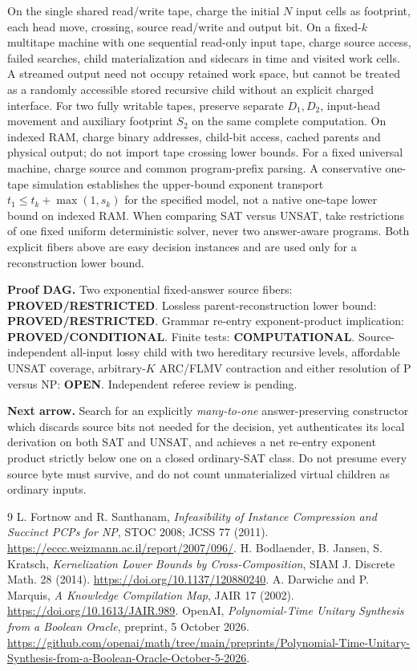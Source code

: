 \documentclass{article}
\begin{document}
On the single shared read/write tape, charge the initial $N$
input cells as footprint, each head move, crossing, source
read/write and output bit. On a fixed-$k$ multitape machine
with one sequential read-only input tape, charge source
access, failed searches, child materialization and sidecars in
time and visited work cells. A streamed output need not occupy
retained work space, but cannot be treated as a randomly accessible
stored recursive child without an explicit charged interface.
For two fully writable tapes, preserve separate $D_1,D_2$,
input-head movement and auxiliary footprint $S_2$ on the
same complete computation. On indexed RAM, charge binary
addresses, child-bit access, cached parents and physical output;
do not import tape crossing lower bounds. For a fixed universal
machine, charge source and common program-prefix parsing.
A conservative one-tape simulation establishes the
upper-bound exponent transport
$t_1\le t_k+\max(1,s_k)$ for the specified model, not a native
one-tape lower bound on indexed RAM.
When comparing SAT versus UNSAT, take restrictions of one
fixed uniform deterministic solver, never two answer-aware
programs. Both explicit fibers above are easy decision
instances and are used only for a reconstruction lower bound.

\noindent\textbf{Proof DAG.}
Two exponential fixed-answer source fibers:
\textbf{PROVED/RESTRICTED}.
Lossless parent-reconstruction lower bound:
\textbf{PROVED/RESTRICTED}.
Grammar re-entry exponent-product implication:
\textbf{PROVED/CONDITIONAL}.
Finite tests: \textbf{COMPUTATIONAL}.
Source-independent all-input lossy child with two hereditary
recursive levels, affordable UNSAT coverage, arbitrary-$K$
ARC/FLMV contraction and either resolution of P versus NP:
\textbf{OPEN}. Independent referee review is pending.

\noindent\textbf{Next arrow.}
Search for an explicitly \emph{many-to-one} answer-preserving
constructor which discards source bits not needed for
the decision, yet authenticates its local derivation on both
SAT and UNSAT, and achieves a net re-entry exponent product
strictly below one on a closed ordinary-SAT class.
Do not presume every source byte must survive, and do not
count unmaterialized virtual children as ordinary inputs.

\begin{thebibliography}{9}
 L. Fortnow and R. Santhanam,
\emph{Infeasibility of Instance Compression and Succinct PCPs for NP},
STOC 2008; JCSS 77 (2011).
\url{https://eccc.weizmann.ac.il/report/2007/096/}.
 H. Bodlaender, B. Jansen, S. Kratsch,
\emph{Kernelization Lower Bounds by Cross-Composition},
SIAM J. Discrete Math. 28 (2014).
\url{https://doi.org/10.1137/120880240}.
 A. Darwiche and P. Marquis,
\emph{A Knowledge Compilation Map}, JAIR 17 (2002).
\url{https://doi.org/10.1613/JAIR.989}.
 OpenAI,
\emph{Polynomial-Time Unitary Synthesis from a Boolean Oracle},
preprint, 5 October 2026.
\url{https://github.com/openai/math/tree/main/preprints/Polynomial-Time-Unitary-Synthesis-from-a-Boolean-Oracle-October-5-2026}.
\end{thebibliography}
\end{document}
